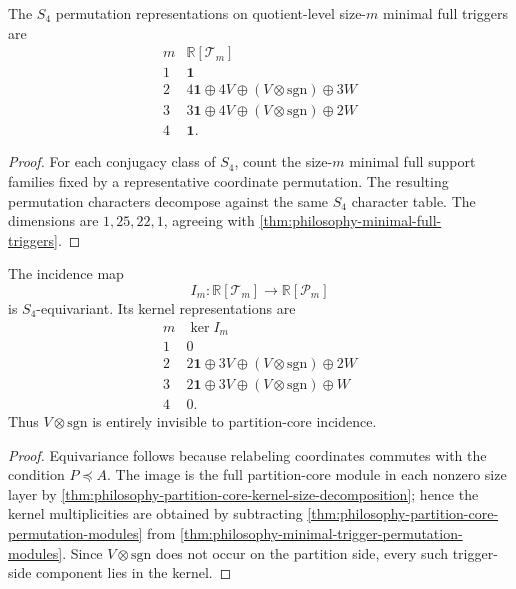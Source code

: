 \begin{theorem}
\label{thm:philosophy-minimal-trigger-permutation-modules}
The $S_{4}$ permutation representations on quotient-level size-$m$
minimal full triggers are
$$
\begin{array}{c|c}
  m & \mathbb{R}[\mathcal{T}_{m}]\\
  \hline
  1 & \mathbf{1}\\
  2 & 4\mathbf{1}\oplus4V\oplus(V\otimes\mathrm{sgn})\oplus3W\\
  3 & 3\mathbf{1}\oplus4V\oplus(V\otimes\mathrm{sgn})\oplus2W\\
  4 & \mathbf{1}.
\end{array}
$$
\end{theorem}
\begin{proof}
For each conjugacy class of $S_{4}$, count the size-$m$ minimal full
support families fixed by a representative coordinate permutation. The
resulting permutation characters decompose against the same $S_{4}$
character table. The dimensions are $1,25,22,1$, agreeing with
\autoref{thm:philosophy-minimal-full-triggers}.
\end{proof}

\begin{theorem}
\label{thm:philosophy-partition-core-incidence-kernel-representation}
The incidence map
$$
  I_{m}:\mathbb{R}[\mathcal{T}_{m}]
  \longrightarrow
  \mathbb{R}[\mathcal{P}_{m}]
$$
is $S_{4}$-equivariant. Its kernel representations are
$$
\begin{array}{c|c}
  m & \ker I_{m}\\
  \hline
  1 & 0\\
  2 & 2\mathbf{1}\oplus3V\oplus(V\otimes\mathrm{sgn})\oplus2W\\
  3 & 2\mathbf{1}\oplus3V\oplus(V\otimes\mathrm{sgn})\oplus W\\
  4 & 0.
\end{array}
$$
Thus $V\otimes\mathrm{sgn}$ is entirely invisible to partition-core
incidence.
\end{theorem}
\begin{proof}
Equivariance follows because relabeling coordinates commutes with the
condition $P\preceq A$. The image is the full partition-core module in
each nonzero size layer by
\autoref{thm:philosophy-partition-core-kernel-size-decomposition}; hence
the kernel multiplicities are obtained by subtracting
\autoref{thm:philosophy-partition-core-permutation-modules} from
\autoref{thm:philosophy-minimal-trigger-permutation-modules}. Since
$V\otimes\mathrm{sgn}$ does not occur on the partition side, every such
trigger-side component lies in the kernel.
\end{proof}


